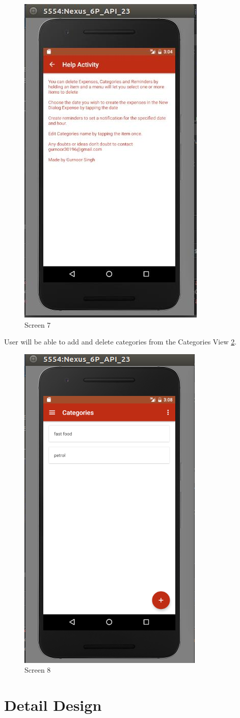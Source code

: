 \begin{figure}[ht]
\centering
\includegraphics[scale=0.38]{images/s7.png}
\caption{Screen 7}
\label{fig:7}
\end{figure}
\noindent User will be able to add and delete categories from the Categories View \ref{fig:8}. 

\begin{figure}[ht]
\centering
\includegraphics[scale=0.38]{images/s8.png}
\caption{Screen 8}
\label{fig:8}
\end{figure}
\fi

\section{Detail Design}